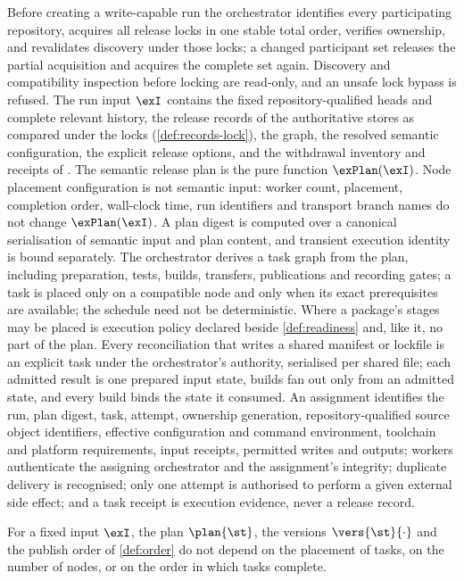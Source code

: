 \begin{definition}
\label{def:exec-input}
Before creating a write-capable run the orchestrator identifies every
participating repository, acquires all release locks in one stable total
order, verifies ownership, and revalidates discovery under those locks; a
changed participant set releases the partial acquisition and acquires the
complete set again. Discovery and compatibility inspection before locking are
read-only, and an unsafe lock bypass is refused. The run input $\exI$ contains
the fixed repository-qualified heads and complete relevant history, the release
records of the authoritative stores as compared under the locks
(\cref{def:records-lock}), the graph, the resolved semantic configuration, the
explicit release options, and the withdrawal inventory and receipts of
. The semantic release plan is the pure function $\exPlan(\exI)$.
Node placement configuration is not semantic input: worker count, placement,
completion order, wall-clock time, run identifiers and transport branch names
do not change $\exPlan(\exI)$. A plan digest is computed over a canonical
serialisation of semantic input and plan content, and transient execution
identity is bound separately. The orchestrator derives a task graph from the
plan, including preparation, tests, builds, transfers, publications and
recording gates; a task is placed only on a compatible node and only when its
exact prerequisites are available; the schedule need not be deterministic.
Where a package's stages may be placed is execution policy declared beside
\cref{def:readiness} and, like it, no part of the plan. Every reconciliation
that writes a shared manifest or lockfile is an explicit task under the
orchestrator's authority, serialised per shared file; each admitted result is
one prepared input state, builds fan out only from an admitted state, and
every build binds the state it consumed. An assignment identifies the run,
plan digest, task, attempt, ownership generation, repository-qualified source
object identifiers, effective configuration and command environment,
toolchain and platform requirements, input receipts, permitted writes and
outputs; workers authenticate the assigning orchestrator and the assignment's
integrity; duplicate delivery is recognised; only one attempt is authorised
to perform a given external side effect; and a task receipt is execution
evidence, never a release record.
\end{definition}

\begin{proposition}
\label{prop:exec-placement}
For a fixed input $\exI$, the plan $\plan{\st}$, the versions
$\vers{\st}{\cdot}$ and the publish order of \cref{def:order} do not depend on
the placement of tasks, on the number of nodes, or on the order in which tasks
complete.
\end{proposition}

